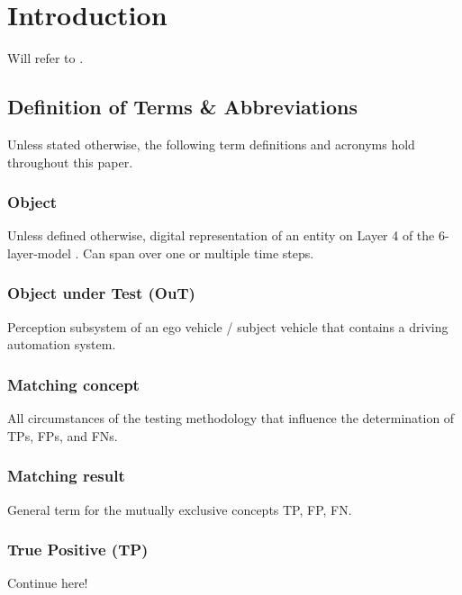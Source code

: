 \documentclass[conference]{IEEEtran}
\begin{document}




\section{Introduction}
\label{sec:introduction}

Will refer to \cite{Hoss2022review}.

\subsection{Definition of Terms \& Abbreviations}
Unless stated otherwise, the following term definitions and acronyms hold throughout this paper.

\subsubsection{Object} Unless defined otherwise, digital representation of an entity on Layer 4 of the 6-layer-model \cite{Scholtes20216lmAccess}. Can span over one or multiple time steps. 

\subsubsection{Object under Test (OuT)} Perception subsystem of an ego vehicle / subject vehicle that contains a driving automation system.

\subsubsection{Matching concept} All circumstances of the testing methodology that influence the determination of TPs, FPs, and FNs. 

\subsubsection{Matching result} General term for the mutually exclusive concepts TP, FP, FN.  

\subsubsection{True Positive (TP)} Continue here!
\end{document}
